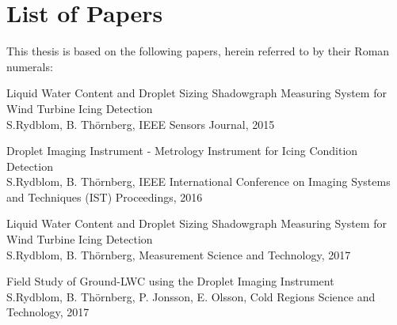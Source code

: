 

\thispagestyle{plain}

\chapter*{List of Papers}
\vspace{20pt}

\noindent This thesis is based on the following papers, herein referred to by their Roman numerals:  

\newcommand{\paperone}{Liquid Water Content and Droplet Sizing Shadowgraph Measuring System for Wind Turbine Icing Detection}
\newcommand{\papertwo}{Droplet Imaging Instrument - Metrology Instrument for Icing Condition Detection}
\newcommand{\paperthree}{Size measurement validation of the droplet imaging instrument}
\newcommand{\paperfour}{Field Study of Ground-LWC using the Droplet Imaging Instrument}

\newcommand{\authorone}{S.Rydblom, B. Thörnberg}
\newcommand{\authortwo}{S.Rydblom, B. Thörnberg, P. Jonsson, E. Olsson}


\newcommand{\ieeesens}{IEEE Sensors Journal}
\newcommand{\ieeeconf}{IEEE International Conference on Imaging Systems and Techniques (IST) Proceedings}
\newcommand{\mst}{Measurement Science and Technology}
\newcommand{\coldreg}{Cold Regions Science and Technology}

\begin{description}[style=nextline]
    \item[Paper I]
    \paperone \\ 
    \authorone, \ieeesens, 2015\dotfill \pageref{pap:paper1}
    
    \item[Paper II]
    \papertwo \\ 
    \authorone, \ieeeconf, 2016\dotfill \pageref{pap:paper2}
 
    \item[Paper III]
    \paperone \\ 
    \authorone, \mst, 2017\dotfill \pageref{pap:paper3}
    
    \item[Paper IV]
    \paperfour \\ 
    \authortwo, \coldreg, 2017\dotfill \pageref{pap:paper4}

%    
%   
%



\end{description}

